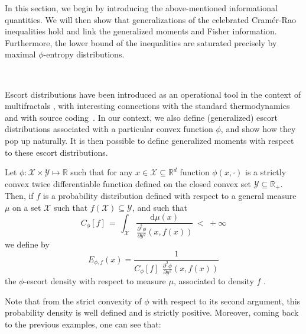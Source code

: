 \documentclass[entropy,article,submit,moreauthors,pdftex]{Definitions/mdpi}
\def\dmu{\mathrm{d}\mu}%
\def\Rset{\mathbb{R}}%
\def\X{\mathcal{X}}%
\def\Y{\mathcal{Y}}%
\begin{document}
In  this section,  we  begin by  introducing  the above-mentioned  informational
quantities.   We  will   then  show  that  generalizations   of  the  celebrated
Cram\'er-Rao  inequalities hold  and  link the  generalized  moments and  Fisher
information.  Furthermore,  the lower  bound of  the inequalities  are saturated
precisely by maximal $\phi$-entropy distributions.

\

Escort distributions have been introduced as  an operational tool in the context
of multifractals  \cite{ChhJen89, BecSch93},  with interesting  connections with
the  standard thermodynamics~\cite{Nau11}  and  with source  coding~\cite{Cam65,
  Ber09}.  In  our context,  we also  define (generalized)  escort distributions
associated with  a particular convex function  $\phi$, and show how  they pop up
naturally.  It  is then possible to  define generalized moments with  respect to
these escort distributions.


\begin{Definition}\label{def:phi-escort}
  Let $\phi: \X \times  \Y \mapsto \Rset$ such that for any  $x \in \X \subseteq
  \Rset^d$ function  $\phi(x,\cdot)$ is  a strictly convex  twice differentiable
  function defined  on the closed convex  set $\Y \subseteq \Rset_+$.   Then, if
  $f$ is  a probability distribution defined  with respect to a  general measure
  $\mu$ on a set $\X$ such that $f(\X) \subseteq \Y$, and such that
  \begin{equation}
  \label{eq:Cphi}
  C_\phi[f]  \,  =  \,  \int_\X  \frac{\dmu(x)}{\frac{\partial^2  \phi}{\partial
      y^2}(x,f(x))} \: < \: + \infty
  \end{equation}
  we define by
  \begin{equation}\label{eq:phi-escort}
  E_{\phi,f}(x)   =  \frac{1}{\displaystyle   C_\phi[f]  \:\,   \frac{\partial^2
      \phi}{\partial y^2}(x,f(x))}
  \end{equation}
  the $\phi$-escort density with respect to measure $\mu$, associated to density
  $f$ .
\end{Definition}
%
Note  that from  the  strict convexity  of  $\phi$ with  respect  to its  second
argument,   this  probability   density  is   well  defined   and  is   strictly
positive. Moreover, coming back to the previous examples, one can see that:
\end{document}
